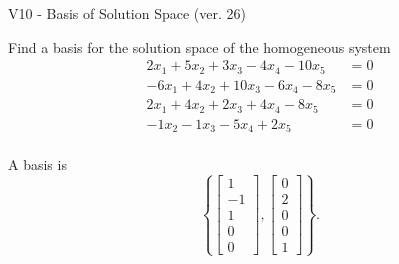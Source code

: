 \begin{exercise}
  \begin{exerciseTitle}V10 - Basis of Solution Space (ver. 26)\end{exerciseTitle}
  \begin{exerciseStatement}
    Find a basis for the solution space of the homogeneous system 
\begin{align*}
 2 x_ 1 + 5 x_ 2 + 3 x_ 3 -4 x_ 4 -10 x_ 5 &= 0  \\ 
  -6 x_ 1 + 4 x_ 2 + 10 x_ 3 -6 x_ 4 -8 x_ 5 &= 0  \\ 
  2 x_ 1 + 4 x_ 2 + 2 x_ 3 + 4 x_ 4 -8 x_ 5 &= 0  \\ 
  -1 x_ 2 -1 x_ 3 -5 x_ 4 + 2 x_ 5 &= 0  \\ 
 \end{align*}


 
  \end{exerciseStatement}

  \begin{exerciseAnswer}
   A basis is   
\[\left\{\left[\begin{array}{c}
1 \\
-1 \\
1 \\
0 \\
0
\end{array}\right] , \left[\begin{array}{c}
0 \\
2 \\
0 \\
0 \\
1
\end{array}\right]\right\}.\]

  


  \end{exerciseAnswer}
\end{exercise}